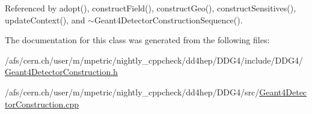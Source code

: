 Referenced by adopt(), constructField(), constructGeo(), constructSensitives(), updateContext(), and $\sim$Geant4DetectorConstructionSequence().

The documentation for this class was generated from the following files:\begin{DoxyCompactItemize}
\item 
/afs/cern.ch/user/m/mpetric/nightly\_\-cppcheck/dd4hep/DDG4/include/DDG4/\hyperlink{_geant4_detector_construction_8h}{Geant4DetectorConstruction.h}\item 
/afs/cern.ch/user/m/mpetric/nightly\_\-cppcheck/dd4hep/DDG4/src/\hyperlink{_geant4_detector_construction_8cpp}{Geant4DetectorConstruction.cpp}\end{DoxyCompactItemize}

